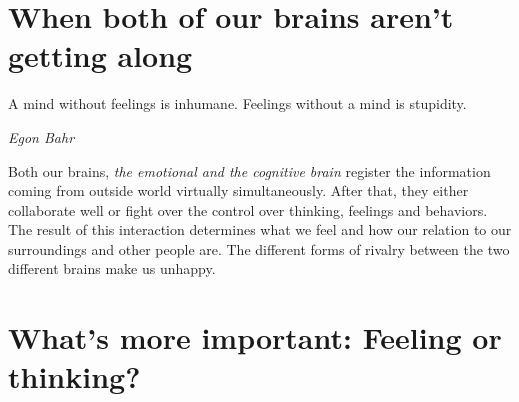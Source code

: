 \documentclass[../main.tex]{subfiles}
\begin{document}
\section{When both of our brains aren't getting along}

\epigraph{A mind without feelings is inhumane. Feelings without a mind is stupidity.}{\textit{Egon Bahr}}

Both our brains,  \emph{the emotional and the cognitive brain} register the information coming from outside world virtually simultaneously.
After that, they either collaborate well or fight over the control over thinking, feelings and behaviors.
The result of this interaction determines what we feel and how our relation to our surroundings and other people are.
The different forms of rivalry between the two different brains make us unhappy.

\section{What's more important: Feeling or thinking?}
\end{document}
